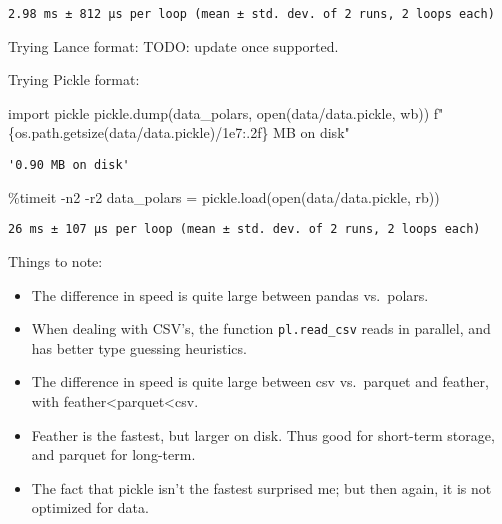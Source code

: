 \documentclass[
  letterpaper,
  DIV=11,
  numbers=noendperiod]{scrartcl}
\newenvironment{Shaded}{\begin{snugshade}}{\end{snugshade}}
\newcommand{\BuiltInTok}[1]{\textcolor[rgb]{0.00,0.23,0.31}{#1}}
\newcommand{\FloatTok}[1]{\textcolor[rgb]{0.68,0.00,0.00}{#1}}
\newcommand{\ImportTok}[1]{\textcolor[rgb]{0.00,0.46,0.62}{#1}}
\newcommand{\NormalTok}[1]{\textcolor[rgb]{0.00,0.23,0.31}{#1}}
\newcommand{\OperatorTok}[1]{\textcolor[rgb]{0.37,0.37,0.37}{#1}}
\newcommand{\SpecialCharTok}[1]{\textcolor[rgb]{0.37,0.37,0.37}{#1}}
\newcommand{\SpecialStringTok}[1]{\textcolor[rgb]{0.13,0.47,0.30}{#1}}
\newcommand{\StringTok}[1]{\textcolor[rgb]{0.13,0.47,0.30}{#1}}
\providecommand{\tightlist}{%
  \setlength{\itemsep}{0pt}\setlength{\parskip}{0pt}}\usepackage{longtable,booktabs,array}
\begin{document}
\begin{verbatim}
2.98 ms ± 812 µs per loop (mean ± std. dev. of 2 runs, 2 loops each)
\end{verbatim}

Trying Lance format: TODO: update once supported.

Trying Pickle format:

\begin{Shaded}
\begin{Highlighting}[]
\ImportTok{import}\NormalTok{ pickle}
\NormalTok{pickle.dump(data\_polars, }\BuiltInTok{open}\NormalTok{(}\StringTok{\textquotesingle{}data/data.pickle\textquotesingle{}}\NormalTok{, }\StringTok{\textquotesingle{}wb\textquotesingle{}}\NormalTok{))}
\SpecialStringTok{f"}\SpecialCharTok{\{}\NormalTok{os}\SpecialCharTok{.}\NormalTok{path}\SpecialCharTok{.}\NormalTok{getsize(}\StringTok{\textquotesingle{}data/data.pickle\textquotesingle{}}\NormalTok{)}\OperatorTok{/}\FloatTok{1e7}\SpecialCharTok{:.2f\}}\SpecialStringTok{ MB on disk"}
\end{Highlighting}
\end{Shaded}

\begin{verbatim}
'0.90 MB on disk'
\end{verbatim}

\begin{Shaded}
\begin{Highlighting}[]
\OperatorTok{\%}\NormalTok{timeit }\OperatorTok{{-}}\NormalTok{n2 }\OperatorTok{{-}}\NormalTok{r2 data\_polars }\OperatorTok{=}\NormalTok{ pickle.load(}\BuiltInTok{open}\NormalTok{(}\StringTok{\textquotesingle{}data/data.pickle\textquotesingle{}}\NormalTok{, }\StringTok{\textquotesingle{}rb\textquotesingle{}}\NormalTok{))}
\end{Highlighting}
\end{Shaded}

\begin{verbatim}
26 ms ± 107 µs per loop (mean ± std. dev. of 2 runs, 2 loops each)
\end{verbatim}

Things to note:

\begin{itemize}
\tightlist
\item
  The difference in speed is quite large between pandas vs.~polars.
\item
  When dealing with CSV's, the function \texttt{pl.read\_csv} reads in
  parallel, and has better type guessing heuristics.
\item
  The difference in speed is quite large between csv vs.~parquet and
  feather, with feather\textless parquet\textless csv.
\item
  Feather is the fastest, but larger on disk. Thus good for short-term
  storage, and parquet for long-term.
\item
  The fact that pickle isn't the fastest surprised me; but then again,
  it is not optimized for data.
\end{itemize}
\end{document}
